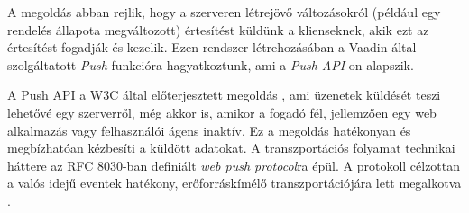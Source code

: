 A megoldás abban rejlik, hogy a szerveren létrejövő változásokról (például egy rendelés állapota megváltozott) értesítést küldünk a klienseknek, akik ezt az értesítést fogadják és kezelik. Ezen rendszer létrehozásában a Vaadin által szolgáltatott \emph{Push} funkcióra hagyatkoztunk, ami a \emph{Push API}-on alapszik. \par

A Push API a W3C által előterjesztett megoldás \cite{Beverloo:22:PA}, ami üzenetek küldését teszi lehetővé egy szerverről, még akkor is, amikor a fogadó fél, jellemzően egy web alkalmazás vagy felhasználói ágens inaktív. Ez a megoldás hatékonyan és megbízhatóan kézbesíti a küldött adatokat. A transzportációs folyamat technikai háttere az RFC 8030-ban definiált \emph{web push protocol}ra épül. A protokoll célzottan a valós idejű eventek hatékony, erőforráskímélő transzportációjára lett megalkotva \cite{RFC8030}.